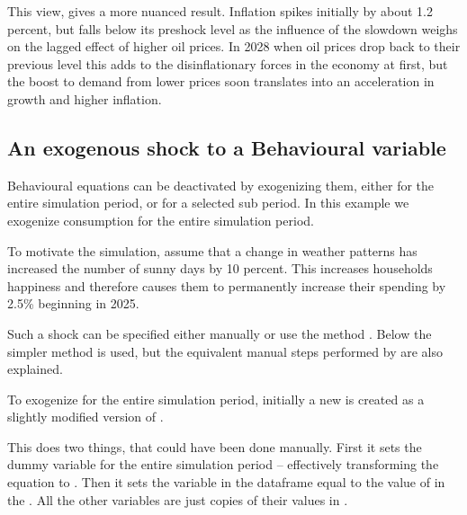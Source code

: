 \documentclass[letterpaper,10pt,english]{jupyterBook}
\begin{document}
\sphinxAtStartPar
This view, gives a more nuanced result.  Inflation spikes initially by about 1.2 percent, but falls below its pre\sphinxhyphen{}shock level as the influence of the slowdown weighs on the lagged effect of higher oil prices. In 2028 when oil prices drop back to their previous level this adds to the dis\sphinxhyphen{}inflationary forces in the economy at first, but the boost to demand from lower prices soon translates into an acceleration in growth and higher inflation.


\subsection{An exogenous shock to a Behavioural variable}
\label{\detokenize{content/06_WBModels/ScenarioAnalysis:an-exogenous-shock-to-a-behavioural-variable}}
\sphinxAtStartPar
Behavioural equations can be de\sphinxhyphen{}activated by exogenizing them, either for the entire simulation period, or for a selected sub period.  In this example we exogenize consumption for the entire simulation period.

\sphinxAtStartPar
To motivate the simulation, assume that a change in weather patterns has increased the number of sunny days by 10 percent. This increases households happiness and therefore causes them to permanently increase their spending by 2.5\% beginning in 2025.

\sphinxAtStartPar
Such a shock can be specified either manually or use the method . Below the simpler  method is used, but the equivalent manual steps performed by  are also explained.

\sphinxAtStartPar
To exogenize  for the entire simulation period, initially a new  is created as a slightly modified version of  .

\sphinxAtStartPar
{}

\sphinxAtStartPar
This does two things, that could have been done manually.  First it sets the dummy variable  for the entire simulation period – effectively transforming the equation to .  Then it sets the variable  in the  dataframe equal to the value of  in the  . All the other variables are  just copies of their values in .
\end{document}
